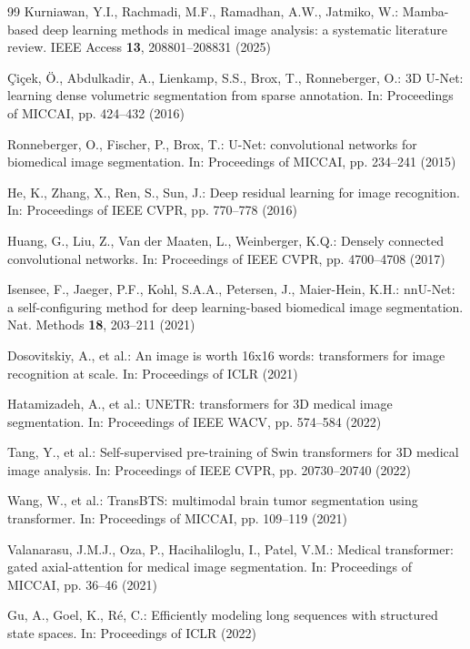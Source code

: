 \documentclass[pdflatex,sn-mathphys-num]{sn-jnl}
\begin{document}
\begin{thebibliography}{99}
Kurniawan, Y.I., Rachmadi, M.F., Ramadhan, A.W., Jatmiko, W.: Mamba-based deep learning methods in medical image analysis: a systematic literature review. IEEE Access \textbf{13}, 208801--208831 (2025)

\c{C}i\c{c}ek, \"O., Abdulkadir, A., Lienkamp, S.S., Brox, T., Ronneberger, O.: 3D U-Net: learning dense volumetric segmentation from sparse annotation. In: Proceedings of MICCAI, pp. 424--432 (2016)

Ronneberger, O., Fischer, P., Brox, T.: U-Net: convolutional networks for biomedical image segmentation. In: Proceedings of MICCAI, pp. 234--241 (2015)

He, K., Zhang, X., Ren, S., Sun, J.: Deep residual learning for image recognition. In: Proceedings of IEEE CVPR, pp. 770--778 (2016)

Huang, G., Liu, Z., Van der Maaten, L., Weinberger, K.Q.: Densely connected convolutional networks. In: Proceedings of IEEE CVPR, pp. 4700--4708 (2017)

Isensee, F., Jaeger, P.F., Kohl, S.A.A., Petersen, J., Maier-Hein, K.H.: nnU-Net: a self-configuring method for deep learning-based biomedical image segmentation. Nat. Methods \textbf{18}, 203--211 (2021)

Dosovitskiy, A., et al.: An image is worth 16x16 words: transformers for image recognition at scale. In: Proceedings of ICLR (2021)

Hatamizadeh, A., et al.: UNETR: transformers for 3D medical image segmentation. In: Proceedings of IEEE WACV, pp. 574--584 (2022)

Tang, Y., et al.: Self-supervised pre-training of Swin transformers for 3D medical image analysis. In: Proceedings of IEEE CVPR, pp. 20730--20740 (2022)

Wang, W., et al.: TransBTS: multimodal brain tumor segmentation using transformer. In: Proceedings of MICCAI, pp. 109--119 (2021)

Valanarasu, J.M.J., Oza, P., Hacihaliloglu, I., Patel, V.M.: Medical transformer: gated axial-attention for medical image segmentation. In: Proceedings of MICCAI, pp. 36--46 (2021)

Gu, A., Goel, K., R\'e, C.: Efficiently modeling long sequences with structured state spaces. In: Proceedings of ICLR (2022)


\end{thebibliography}
\end{document}
